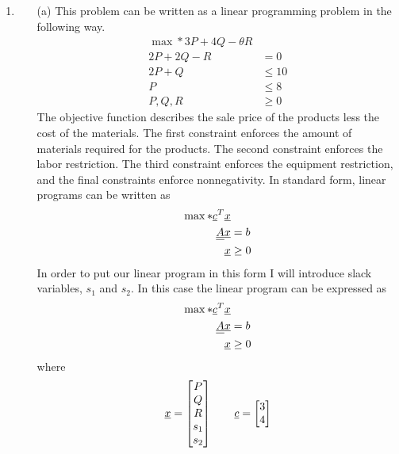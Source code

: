 \documentclass[11pt, oneside]{article}
\begin{document}
\begin{enumerate}
  \item %
    \begin{enumerate}
      \item[(a)] %
        This problem can be written as a linear programming problem in the
        following way.
        \begin{align*}
          \max*{} 3P + 4Q - \theta R & \\
          2P + 2Q - R &= 0 \\
          2P + Q &\le 10 \\
          P &\le 8 \\
          P, Q, R &\ge 0
        \end{align*}
        The objective function describes the sale price of the products less
        the cost of the materials.
        The first constraint enforces the amount of materials required for
        the products.
        The second constraint enforces the labor restriction.
        The third constraint enforces the equipment restriction, and the 
        final constraints enforce nonnegativity.
        In standard form, linear programs can be written as
        \begin{align*}
          \max*{} \underline{c}^T \underline{x} & \\
          \underline{\underline{A}} \underline{x} &= b \\
          \underline{x} &\ge 0
        \end{align*}
        In order to put our linear program in this form I will introduce
        slack variables, $s_1$ and $s_2$.
        In this case the linear program can be expressed as
        \begin{align*}
          \max*{} \underline{c}^T \underline{x} & \\
          \underline{\underline{A}} \underline{x} &= b \\
          \underline{x} &\ge 0
        \end{align*}
        where
        \begin{align*}
          \underline{x} =
          \begin{bmatrix}
            P \\
            Q \\
            R \\
            s_1 \\
            s_2
          \end{bmatrix} \qquad
          \underline{c} =
          \begin{bmatrix}
            3 \\
            4 \\

\end{bmatrix}
\end{align*}
\end{enumerate}
\end{enumerate}
\end{document}
